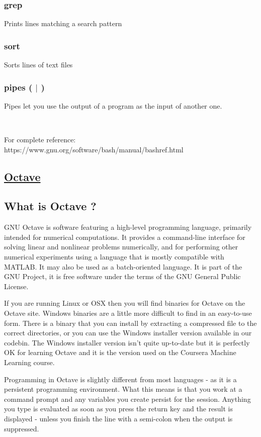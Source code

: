 \documentclass[a4paper, 12pt]{article}
\begin{document}
\subsubsection{grep}
Prints lines matching a search pattern

\subsubsection{sort}
Sorts lines of text files

\subsubsection{pipes ( $\mid$ )}
Pipes let you use the output of a program as the input of another one.

\

For complete reference: \\
https://www.gnu.org/software/bash/manual/bashref.html

\begin{center}
\section{\underline{Octave}}
\end{center}

\subsection{What is Octave ?}
GNU Octave is software featuring a high-level programming language, primarily intended for numerical computations. It provides a command-line interface for solving linear and nonlinear problems numerically, and for performing other numerical experiments using a language that is mostly compatible with MATLAB. It may also be used as a batch-oriented language. It is part of the GNU Project, it is free software under the terms of the GNU General Public License.

If you are running Linux or OSX then you will find binaries for Octave on the Octave site. Windows binaries are a little more difficult to find in an easy-to-use form. There is a binary that you can install by extracting a compressed file to the correct directories, or you can use the Windows installer version available in our codebin. The Windows installer version isn't quite up-to-date but it is perfectly OK for learning Octave and it is the version used on the Coursera Machine Learning course.

Programming in Octave is slightly different from most languages - as it is a persistent programming environment. What this means is that you work at a command prompt and any variables you create persist for the session. Anything you type is evaluated as soon as you press the return key and the result is displayed - unless you finish the line with a semi-colon when the output is suppressed.\\
\end{document}
